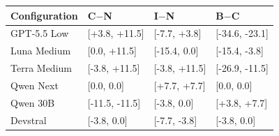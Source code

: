\begin{tabular}{llll}
\toprule
Configuration & C$-$N & I$-$N & B$-$C\\
\midrule
GPT-5.5 Low & [+3.8, +11.5] & [-7.7, +3.8] & [-34.6, -23.1]\\
Luna Medium & [0.0, +11.5] & [-15.4, 0.0] & [-15.4, -3.8]\\
Terra Medium & [-3.8, +11.5] & [-3.8, +11.5] & [-26.9, -11.5]\\
Qwen Next & [0.0, 0.0] & [+7.7, +7.7] & [0.0, 0.0]\\
Qwen 30B & [-11.5, -11.5] & [-3.8, 0.0] & [+3.8, +7.7]\\
Devstral & [-3.8, 0.0] & [-7.7, -3.8] & [-3.8, 0.0]\\
\bottomrule
\end{tabular}
